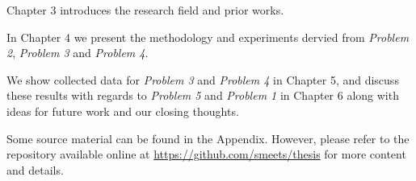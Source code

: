 Chapter 3 introduces the research field and prior works.

In Chapter 4 we present the methodology and experiments dervied from \emph{Problem 2}, \emph{Problem 3} and \emph{Problem 4}. 

We show collected data for \emph{Problem 3} and \emph{Problem 4} in Chapter 5,
and discuss these results with regards to \emph{Problem 5} and \emph
{Problem 1} in Chapter 6 along with ideas for future work and our closing
thoughts.

Some source material can be found in the Appendix. However, please refer to the repository available online at \url{https://github.com/smeets/thesis} for more content and details.


